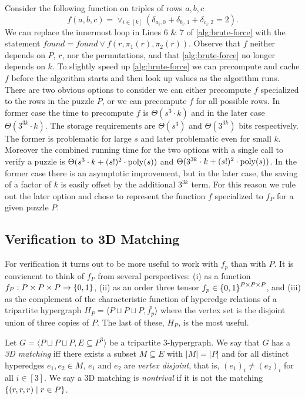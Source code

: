 \documentclass[11pt]{article}
\newcommand\sse{\subseteq}
\newcommand\condset[2]{\set{#1 \;|\; #2}}
\begin{document}
Consider the following function on triples of rows $a, b,
c$ $$f(a,b,c) = \vee_{i \in [k]} (\delta_{a_i,0} + \delta_{b_i,1} +
\delta_{c_i,2} = 2).$$ We can replace the innermost loop in Lines 6 \&
7 of \autoref{alg:brute-force} with the statement $found = found \vee
f(r, \pi_1(r), \pi_2(r))$.  Observe that $f$ neither depends on $P$,
$r$, nor the permutations, and that \autoref{alg:brute-force} no
longer depends on $k$.  To slightly speed up \autoref{alg:brute-force}
we can precompute and cache $f$ before the algorithm starts and then
look up values as the algorithm runs.  There are two obvious options
to consider we can either precompute $f$ specialized to the rows in
the puzzle $P$, or we can precompute $f$ for all possible rows.  In
former case the time to precompute $f$ is $\Theta(s^3 \cdot k)$ and in
the later case $\Theta(3^{3k} \cdot k)$.  The storage requirements are
$\Theta(s^3)$ and $\Theta(3^{3k})$ bits respectively.  The former is
problematic for large $s$ and later problematic even for small $k$.
Moreover the combined running time for the two options with a single
call to verify a puzzle is $\Theta(s^3 \cdot k + (s!)^2 \cdot
\operatorname{poly}(s))$ and $\Theta(3^{3k} \cdot k + (s!)^2 \cdot \operatorname{poly}(s))$.  In
the former case there is an asymptotic improvement, but in the later
case, the saving of a factor of $k$ is easily offset by the additional
$3^{3k}$ term.  For this reason we rule out the later option and chose
to represent the function $f$ specialized to $f_P$ for a given puzzle
$P$.

\subsection{Verification to 3D Matching}

For verification it turns out to be more useful to work with $f_p$
than with $P$.  It is convienent to think of $f_P$ from several
perspectives: (i) as a function $f_P : P \times P \times P \rightarrow
\left\{ 0, 1 \right\}$, (ii) as an order three tensor $f_p \in \left\{ 0,1 \right\}^{P
  \times P \times P}$, and (iii) as the complement of the
characteristic function of hyperedge relations of a tripartite
hypergraph $H_P = \langle P \sqcup P \sqcup P, \bar{f_p}\rangle$ where
the vertex set is the disjoint union of three copies of $P$.  The last
of these, $H_P$, is the most useful.

Let $G = \langle P \sqcup P \sqcup P, E \sse P^3\rangle$ be a
tripartite 3-hypergraph.  We say that $G$ has a \emph{3D matching} iff
there exists a subset $M \sse E$ with $|M| = |P|$ and for all distinct
hyperedges $e_1, e_2 \in M$, $e_1$ and $e_2$ are \emph{vertex
  disjoint}, that is, $(e_1)_i \neq (e_2)_i$ for all $i \in [3]$.  We
say a 3D matching is \emph{nontrival} if it is not the matching
$\condset{(r,r,r)}{r \in P}$.
\end{document}
